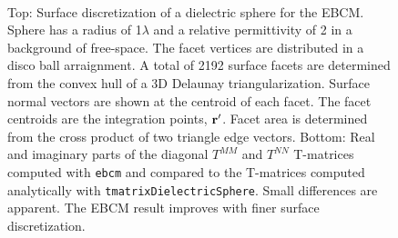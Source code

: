 \begin{figure}[H] 
   \centering
    \\
   \caption{Top: Surface discretization of a dielectric sphere for the EBCM. Sphere has a radius of 1$\lambda$ and a relative permittivity of 2 in a background of free-space. The facet vertices are distributed in a disco ball arraignment. A total of 2192 surface facets are determined from the convex hull of a 3D Delaunay triangularization. Surface normal vectors are shown at the centroid of each facet. The facet centroids are the integration points, $\mathbf{r}'$. Facet area is determined from the cross product of two triangle edge vectors. Bottom: Real and imaginary parts of the diagonal $T^{MM}$ and $T^{NN}$ T-matrices computed with \texttt{ebcm} and compared to the T-matrices computed analytically with \texttt{tmatrixDielectricSphere}. Small differences are apparent. The EBCM result improves with finer surface discretization. }

\end{figure}
